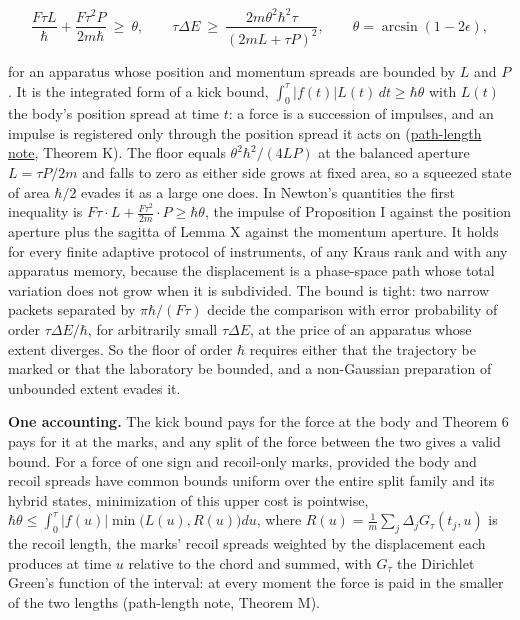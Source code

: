 \documentclass[11pt,a4paper]{article}
\begin{document}
\[\frac{F\tau L}{\hbar}+\frac{F\tau^2P}{2m\hbar}\ \ge\ \theta,
\qquad\tau\Delta E\ \ge\ \frac{2m\theta^2\hbar^2\tau}{(2mL+\tau P)^2},
\qquad\theta=\arcsin(1-2\epsilon),\]

for an apparatus whose position and momentum spreads are bounded by
\(L\) and \(P\). It is the integrated form of a kick bound,
\(\int_0^\tau|f(t)|L(t)\,dt\ge\hbar\theta\) with \(L(t)\) the body's
position spread at time \(t\): a force is a succession of impulses, and
an impulse is registered only through the position spread it acts on
(\href{record-distance-path-length.md}{path-length note}, Theorem K).
The floor equals \(\theta^2\hbar^2/(4LP)\) at the balanced aperture
\(L=\tau P/2m\) and falls to zero as either side grows at fixed area, so
a squeezed state of area \(\hbar/2\) evades it as a large one does. In
Newton's quantities the first inequality is
\(F\tau\cdot L+\frac{F\tau^2}{2m}\cdot P\ge\hbar\theta\), the impulse of
Proposition I against the position aperture plus the sagitta of Lemma X
against the momentum aperture. It holds for every finite adaptive
protocol of instruments, of any Kraus rank and with any apparatus
memory, because the displacement is a phase-space path whose total
variation does not grow when it is subdivided. The bound is tight: two
narrow packets separated by \(\pi\hbar/(F\tau)\) decide the comparison
with error probability of order \(\tau\Delta E/\hbar\), for arbitrarily
small \(\tau\Delta E\), at the price of an apparatus whose extent
diverges. So the floor of order \(\hbar\) requires either that the
trajectory be marked or that the laboratory be bounded, and a
non-Gaussian preparation of unbounded extent evades it.

\textbf{One accounting.} The kick bound pays for the force at the body
and Theorem 6 pays for it at the marks, and any split of the force
between the two gives a valid bound. For a force of one sign and
recoil-only marks, provided the body and recoil spreads have common
bounds uniform over the entire split family and its hybrid states,
minimization of this upper cost is pointwise,
\(\hbar\theta\le\int_0^\tau|f(u)|\min\bigl(L(u),R(u)\bigr)du\), where
\(R(u)=\frac1m\sum_j\Delta_jG_\tau(t_j,u)\) is the recoil length, the
marks' recoil spreads weighted by the displacement each produces at time
\(u\) relative to the chord and summed, with \(G_\tau\) the Dirichlet
Green's function of the interval: at every moment the force is paid in
the smaller of the two lengths (path-length note, Theorem M).
\end{document}
